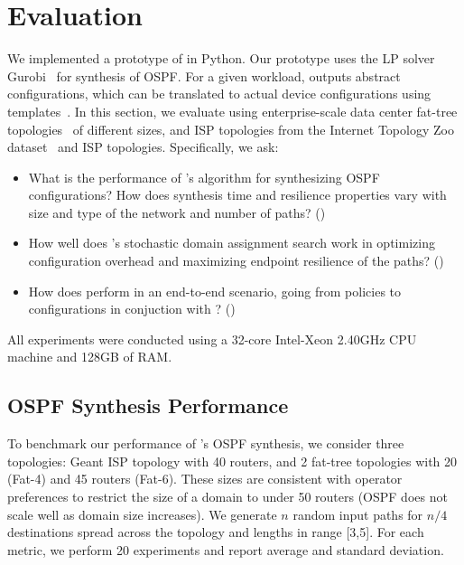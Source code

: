 \section{Evaluation}
 \label{sec:evaluation}
 
 We implemented a 
 prototype of \name in Python. Our prototype uses the LP solver Gurobi~\cite{gurobi} for synthesis of 
 OSPF.   For a given
 workload, \name outputs abstract configurations, which
can be 
 translated to actual device configurations using templates~\cite{template}.
In this section, we evaluate \Name using
enterprise-scale data
center fat-tree topologies~\cite{fattree} of different 
sizes, and ISP topologies from the Internet Topology Zoo 
dataset~\cite{zoo} and ISP topologies.  
Specifically, we ask:
\begin{itemize}
	\item What is the performance of \Name's algorithm for synthesizing
	OSPF configurations? How does synthesis time and resilience properties 
	vary with size and type of the network and number of paths? ()
	
	\item How well does \name's stochastic domain assignment 
	search work in optimizing configuration overhead
	and maximizing endpoint resilience of the paths? ()
	
	\item How does \name perform in an end-to-end scenario, going
	from policies to configurations in conjuction with \genesis? 
	()
\end{itemize}
All experiments were conducted using a
32-core Intel-Xeon 2.40GHz CPU machine and
128GB of RAM.

\subsection{OSPF Synthesis Performance}
To benchmark our performance of \name's OSPF synthesis,
we consider three topologies: Geant ISP topology with 40 routers,
and 2 fat-tree topologies with 20 (Fat-4) and 45 routers (Fat-6). 
These sizes are consistent with operator preferences to restrict
the size of a domain to under 50 routers (OSPF does not scale
well as domain size increases). We generate $n$ random input paths for
$n/4$ destinations spread across the topology and 
lengths in range [3,5]. For each metric, we perform 20 experiments
and report average and standard deviation. 

